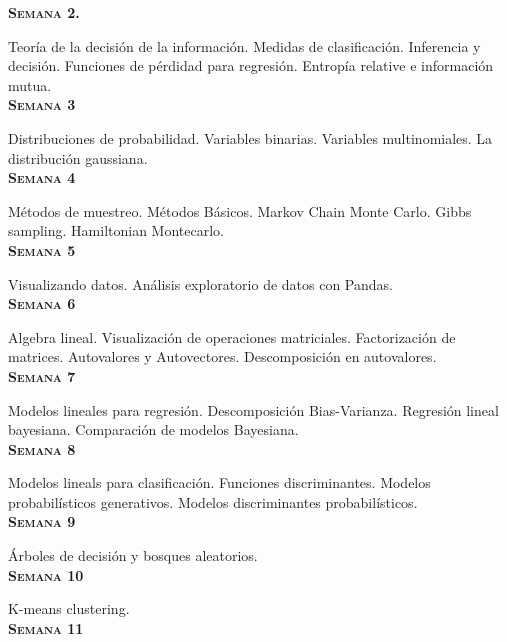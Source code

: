 \documentclass[letterpaper,10pt,onecolumn]{article}
\begin{document}
\noindent\textbf{\textsc{Semana 2.}} 

Teor\'ia de la decisi\'on de la informaci\'on. 
Medidas de clasificaci\'on. Inferencia y decisi\'on.
Funciones de p\'erdidad para regresi\'on.
Entrop\'ia relative e informaci\'on mutua.
\\[-0.3cm] %

\noindent\textbf{\textsc{Semana 3}}

Distribuciones de probabilidad. Variables binarias. Variables
multinomiales. La distribuci\'on gaussiana.
\\[-0.3cm] %

\noindent\textbf{\textsc{Semana 4}}

M\'etodos de muestreo. M\'etodos B\'asicos. Markov Chain Monte
Carlo. Gibbs sampling. Hamiltonian Montecarlo.
\\[-0.3cm] %


\noindent\textbf{\textsc{Semana 5}}

Visualizando datos. An\'alisis exploratorio de datos con Pandas. 
\\[-0.3cm] %

\noindent\textbf{\textsc{Semana 6}}

Algebra lineal. Visualizaci\'on de operaciones
matriciales. Factorizaci\'on de matrices. Autovalores y Autovectores.
Descomposici\'on en autovalores.
\\[-0.3cm] %

\noindent\textbf{\textsc{Semana 7}}

Modelos lineales para regresi\'on. 
Descomposici\'on
Bias-Varianza. Regresi\'on lineal bayesiana.
Comparaci\'on de modelos Bayesiana.
\\[-0.3cm] %

\noindent\textbf{\textsc{Semana 8}}

Modelos lineals para clasificaci\'on.
Funciones discriminantes. Modelos probabil\'isticos generativos.
Modelos discriminantes probabil\'isticos.
\\[-0.3cm] %

\noindent\textbf{\textsc{Semana 9}}

\'Arboles de decisi\'on y bosques aleatorios.
\\[-0.3cm] %

\noindent\textbf{\textsc{Semana 10}}

K-means clustering. 
\\[-0.3cm]

\noindent\textbf{\textsc{Semana 11}}
\end{document}

